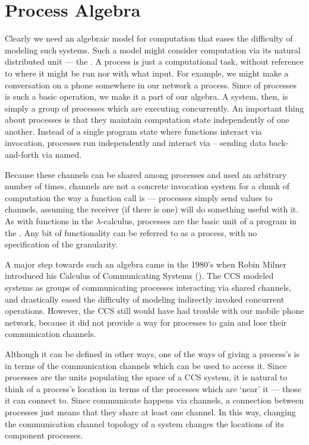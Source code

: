 \section{Process Algebra}
Clearly we need an algebraic model for computation that eases the difficulty of modeling such systems.  
Such a model might consider computation via its natural distributed unit ---  the . 
A process is just a computational task, without reference to where it might be run nor with what input.  
For example, we might make a conversation on a phone somewhere in our network a process. 
Since  of processes is such a basic operation, we make it a part of our algebra.  
A system, then, is simply a group of processes which are executing concurrently. 
An important thing about processes is that they maintain computation state independently of one another.  
Instead of a single program state where functions interact via invocation, processes run independently and interact via  -- sending data back-and-forth via named.  

Because these channels can be shared among processes and used an arbitrary number of times, channels are not a concrete invocation system for a chunk of computation the way a function call is ---  processes simply send values to channels, assuming the receiver (if there is one) will do something useful with it.  
As with functions in the $\lambda$-calculus, processes are the basic unit of a program in the \picalc. 
Any bit of functionality can be referred to as a process, with no specification of the granularity.

A major step towards such an algebra came in the 1980's when Robin Milner introduced his Calculus of Communicating Systems (\!).  
 The CCS modeled systems as groups of communicating processes interacting via shared channels, and drastically eased the difficulty of modeling indirectly invoked concurrent operations.  
However, the CCS still would have had trouble with our mobile phone network, because it did not provide a way for processes to gain and lose their communication channels.

	Although it can be defined in other ways, one of the ways of giving a process's\emph{} is in terms of the communication channels which can be used to access it.  
Since processes are the units populating the space of a CCS system, it is natural to think of a process's location in terms of the processes which are `near' it ---  those it can connect to.  
Since communicate happens via channels, a connection between processes just means that they share at least one channel.  
In this way, changing the communication channel topology of a system changes the locations of its component processes.  

